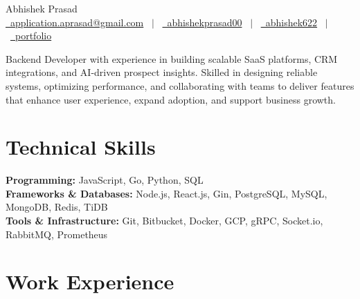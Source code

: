 \documentclass[a4paper,12pt]{article}
\begin{document}
\pagestyle{empty} 

\begin{center}
{\Huge{Abhishek Prasad}} \\[4pt]
\href{mailto:application.aprasad@gmail.com}{\raisebox{-0.05\height}\faEnvelope\ application.aprasad@gmail.com} \ $|$ \
\href{https://linkedin.com/in/abhishekprasad00}{\raisebox{-0.05\height}\faLinkedin\ abhishekprasad00} \ $|$ \
\href{https://github.com/abhishek622}{\raisebox{-0.05\height}\faGithub\ abhishek622} \ $|$ \
\href{https://portfolio.abhishekprasad0602.workers.dev}{\raisebox{-0.05\height}\faGlobe\ portfolio}
\end{center}


Backend Developer with experience in building scalable SaaS platforms, CRM integrations, and AI-driven prospect insights. Skilled in designing reliable systems, optimizing performance, and collaborating with teams to deliver features that enhance user experience, expand adoption, and support business growth.

\section{Technical Skills}
\textbf{Programming:} JavaScript, Go, Python, SQL \\
\textbf{Frameworks \& Databases:} Node.js, React.js, Gin, PostgreSQL, MySQL, MongoDB, Redis, TiDB \\
\textbf{Tools \& Infrastructure:} Git, Bitbucket, Docker, GCP, gRPC, Socket.io, RabbitMQ, Prometheus



\section{Work Experience}
\end{document}
